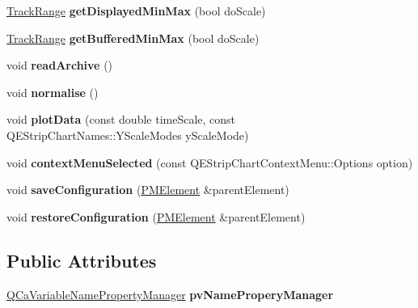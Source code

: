 \begin{DoxyCompactItemize}
\item 
\hypertarget{classQEStripChartItem_ac7f7c16ca613ddf12a57df7c033aaf54}{
\hyperlink{classTrackRange}{TrackRange} {\bfseries getDisplayedMinMax} (bool doScale)}
\label{classQEStripChartItem_ac7f7c16ca613ddf12a57df7c033aaf54}

\item 
\hypertarget{classQEStripChartItem_a67410800517a8b62e063042878fc55b6}{
\hyperlink{classTrackRange}{TrackRange} {\bfseries getBufferedMinMax} (bool doScale)}
\label{classQEStripChartItem_a67410800517a8b62e063042878fc55b6}

\item 
\hypertarget{classQEStripChartItem_a45049b6eb9fbc032f627d8aeb1770633}{
void {\bfseries readArchive} ()}
\label{classQEStripChartItem_a45049b6eb9fbc032f627d8aeb1770633}

\item 
\hypertarget{classQEStripChartItem_a6e60396f7ff124bf2ee2da730b646fff}{
void {\bfseries normalise} ()}
\label{classQEStripChartItem_a6e60396f7ff124bf2ee2da730b646fff}

\item 
\hypertarget{classQEStripChartItem_afbba8b120b0e2c55002d4c1194e0cd6a}{
void {\bfseries plotData} (const double timeScale, const QEStripChartNames::YScaleModes yScaleMode)}
\label{classQEStripChartItem_afbba8b120b0e2c55002d4c1194e0cd6a}

\item 
\hypertarget{classQEStripChartItem_a9b26fde23d10fd1f3da0a046a4785026}{
void {\bfseries contextMenuSelected} (const QEStripChartContextMenu::Options option)}
\label{classQEStripChartItem_a9b26fde23d10fd1f3da0a046a4785026}

\item 
\hypertarget{classQEStripChartItem_a45b37ea47f7795436e6e850aca7be7e9}{
void {\bfseries saveConfiguration} (\hyperlink{classPMElement}{PMElement} \&parentElement)}
\label{classQEStripChartItem_a45b37ea47f7795436e6e850aca7be7e9}

\item 
\hypertarget{classQEStripChartItem_afa2d447607636451b9cfb5be29cd6caf}{
void {\bfseries restoreConfiguration} (\hyperlink{classPMElement}{PMElement} \&parentElement)}
\label{classQEStripChartItem_afa2d447607636451b9cfb5be29cd6caf}

\end{DoxyCompactItemize}
\subsection*{Public Attributes}
\begin{DoxyCompactItemize}
\item 
\hypertarget{classQEStripChartItem_a64705fd0e2a9058e5fcfe994f76f9986}{
\hyperlink{classQCaVariableNamePropertyManager}{QCaVariableNamePropertyManager} {\bfseries pvNameProperyManager}}
\label{classQEStripChartItem_a64705fd0e2a9058e5fcfe994f76f9986}

\end{DoxyCompactItemize}
